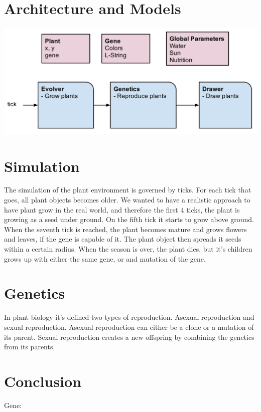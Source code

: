 \documentclass[conference]{acmsiggraph}
\begin{document}
\section{Architecture and Models}

\includegraphics[width=\columnwidth]{images/architecture.png}

\section{Simulation}

The simulation of the plant environment is governed by ticks. For each tick that
goes, all plant objects becomes older. We wanted to have a realistic approach to
have plant grow in the real world, and therefore the first 4 ticks, the plant is
growing as a seed under ground. On the fifth tick it starts to grow above
ground. When the seventh tick is reached, the plant becomes mature and grows
flowers and leaves, if the gene is capable of it. The plant object then spreads
it seeds within a certain radius. When the season is over, the plant dies, but
it’s children grows up with either the same gene, or and mutation of the gene.

\section{Genetics}

In plant biology it’s defined two types of reproduction. Asexual reproduction
and sexual reproduction. Asexual reproduction can either be a clone or a
mutation of its parent. Sexual reproduction creates a new offspring by combining
the genetics from its parents.\cite{plantrepo}

\section{Conclusion}

Gene:
\end{document}
